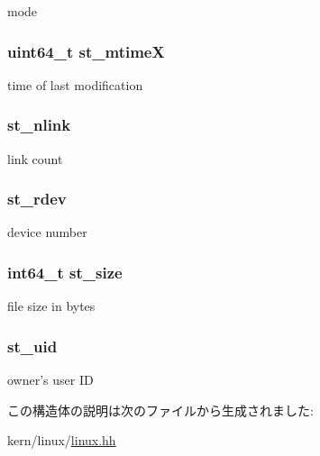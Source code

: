 mode \hypertarget{structLinux_1_1tgt__stat_ab8b373ea7421a08973572a52f534c7f7}{
\subsubsection[{st\_\-mtimeX}]{\setlength{\rightskip}{0pt plus 5cm}uint64\_\-t {\bf st\_\-mtimeX}}}
\label{structLinux_1_1tgt__stat_ab8b373ea7421a08973572a52f534c7f7}


time of last modification \hypertarget{structLinux_1_1tgt__stat_ab77c257c135fa586e930ef0bf0977c08}{
\subsubsection[{st\_\-nlink}]{ {\bf st\_\-nlink}}}
\label{structLinux_1_1tgt__stat_ab77c257c135fa586e930ef0bf0977c08}


link count \hypertarget{structLinux_1_1tgt__stat_ac4a67c3d290b4f93d0d91b99776f4207}{
\subsubsection[{st\_\-rdev}]{ {\bf st\_\-rdev}}}
\label{structLinux_1_1tgt__stat_ac4a67c3d290b4f93d0d91b99776f4207}


device number \hypertarget{structLinux_1_1tgt__stat_aec608d79c93ed6d010aec9f7487e0064}{
\subsubsection[{st\_\-size}]{\setlength{\rightskip}{0pt plus 5cm}int64\_\-t {\bf st\_\-size}}}
\label{structLinux_1_1tgt__stat_aec608d79c93ed6d010aec9f7487e0064}


file size in bytes \hypertarget{structLinux_1_1tgt__stat_ad5477a292a4edf27aa5766e01e0f5d1f}{
\subsubsection[{st\_\-uid}]{ {\bf st\_\-uid}}}
\label{structLinux_1_1tgt__stat_ad5477a292a4edf27aa5766e01e0f5d1f}


owner's user ID 

この構造体の説明は次のファイルから生成されました:\begin{DoxyCompactItemize}
\item 
kern/linux/\hyperlink{kern_2linux_2linux_8hh}{linux.hh}\end{DoxyCompactItemize}
